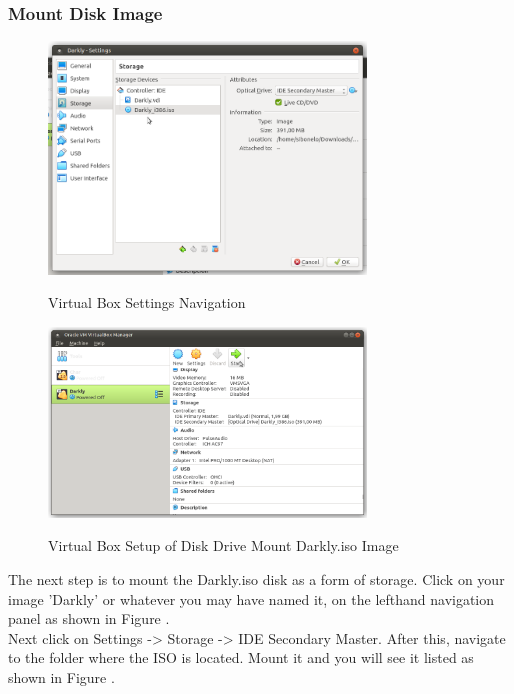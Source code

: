 \subsubsection{Mount Disk Image}
\begin{figure}[!htb]
    \centering
    \includegraphics[width=0.752\textwidth]{images/00-06.png}\\[0cm]  
    \caption[Virtual Box]{Virtual Box Settings Navigation}
    \label{fig:00-06 - Linux Virtual Box ISO Mount} 
\end{figure}
\begin{figure}[!htb]
    \centering
    \includegraphics[width=0.752\textwidth]{images/00-07.png}\\[0cm]  
    \caption[Virtual Box]{Virtual Box Setup of Disk Drive Mount Darkly.iso Image}
    \label{fig:00-07 - Linux Virtual Box ISO Mount} 
\end{figure}
The next step is to mount the Darkly.iso disk as a form of storage. Click on
your image 'Darkly' or whatever you may have named it, on the lefthand navigation
panel as shown in Figure .\\

Next click on Settings -> Storage -> IDE Secondary Master. After this, navigate
to the folder where the ISO is located. Mount it and you will see it listed
as shown in Figure .\\

